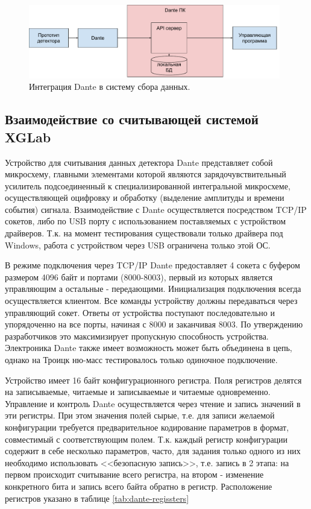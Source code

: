 \documentclass[a4paper,14pt]{extreport}
\begin{document}
\begin{figure}
  \centering
  \includegraphics[width = 0.98\textwidth]{img/dante/integration.pdf}
    \caption{Интеграция Dante в систему сбора данных.}
    \label{fig:dante-integration}
\end{figure}

\subsection{Взаимодействие со считывающей системой XGLab}

Устройство для считывания данных детектора Dante представляет собой микросхему, главными элементами которой являются зарядочувствительный усилитель подсоединенный к специализированной интегральной микросхеме, осуществляющей оцифровку и обработку (выделение амплитуды и времени события) сигнала. Взаимодействие с Dante осуществляется посредством TCP/IP сокетов, либо по USB порту с использованием поставляемых с устройством драйверов. Т.к. на момент тестирования существовали только драйвера под Windows, работа с устройством через USB ограничена только этой ОС.

В режиме подключения через TCP/IP Dante предоставляет 4 сокета с буфером размером 4096 байт и портами (8000-8003), первый из которых является управляющим а остальные - передающими. Инициализация подключения всегда осуществляется клиентом. Все команды устройству должны передаваться через управляющий сокет. Ответы от устройства поступают последовательно и упорядоченно на все порты, начиная с 8000 и заканчивая 8003. По утверждению разработчиков это максимизирует пропускную способность устройства. Электроника Dante также имеет возможность может быть объединена в цепь, однако на Троицк ню-масс тестировалось только одиночное подключение.

Устройство имеет 16 байт конфигурационного регистра. Поля регистров делятся на записываемые, читаемые и записываемые и читаемые одновременно. Управление и контроль Dante осуществляется через чтение и запись значений в эти регистры. При этом значения полей сырые, т.е. для записи желаемой конфигурации требуется предварительное кодирование параметров в формат, совместимый с соответствующим полем. Т.к. каждый регистр конфигурации содержит в себе несколько параметров, часто, для задания только одного из них необходимо использовать <<безопасную запись>>, т.е. запись в 2 этапа: на первом происходит считывание всего регистра, на втором - изменение конкретного бита и запись всего байта обратно в регистр. Расположение регистров указано в таблице \ref{tab:dante-regissters}
\end{document}
